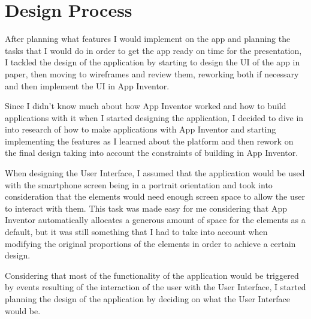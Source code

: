 \chapter{Design Process}
After planning what features I would implement on the app and planning the tasks that I would do in order to get the app ready on time for the presentation, I tackled the design of the application by starting to design the UI of the app in paper, then moving to wireframes and review them, reworking both if necessary and then implement the UI in App Inventor.

Since I didn't know much about how App Inventor worked and how to build applications with it when I started designing the application, I decided to dive in into research of how to make applications with App Inventor and starting implementing the features as I learned about the platform and then rework on the final design taking into account the constraints of building in App Inventor.

When designing the User Interface, I assumed that the application would be used with the smartphone screen being in a portrait orientation and took into consideration that the elements would need enough screen space to allow the user to interact with them. This task was made easy for me considering that App Inventor automatically allocates a generous amount of space for the elements as a default, but it was still something that I had to take into account when modifying the original proportions of the elements in order to achieve a certain design.

Considering that most of the functionality of the application would be triggered by events resulting of the interaction of the user with the User Interface, I started planning the design of the application by deciding on what the User Interface would be.
